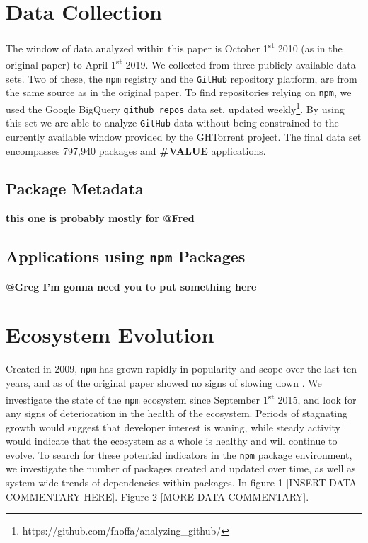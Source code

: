 \documentclass[10pt,conference]{IEEEtran}
\def\code#1{\texttt{#1}}
\begin{document}
\section{Data Collection}
The window of data analyzed within this paper is October 1\textsuperscript{st} 2010 (as in the original paper) to April 1\textsuperscript{st} 2019.
We collected from three publicly available data sets. Two of these, the \code{npm} registry and the \code{GitHub} repository platform, are from the same source as in the original paper.
To find repositories relying on \code{npm}, we used the Google BigQuery \code{github\_repos} data set, updated weekly\footnote{https://github.com/fhoffa/analyzing\_github/}.
By using this set we are able to analyze \code{GitHub} data without being constrained to the currently available window provided by the GHTorrent project\cite{Gousi13}.
The final data set encompasses 797,940 packages and \textbf{\#VALUE} applications.

\subsection{Package Metadata}

\textbf{this one is probably mostly for @Fred}

\subsection{Applications using \code{npm} Packages}

\textbf{@Greg I'm gonna need you to put something here}

\section{Ecosystem Evolution}

Created in 2009, \code{npm} has grown
rapidly in popularity and scope over the last ten years, and 
as of the original paper showed no signs of slowing down \cite{Wittern:2016}.
We investigate the state of the \code{npm} ecosystem
since September 1\textsuperscript{st} 2015, and look for any signs of deterioration in 
the health of the ecosystem. Periods of stagnating growth would suggest
that developer interest is waning, while steady activity would 
indicate that the ecosystem as a whole is healthy and will continue to
evolve. To search for these potential indicators in the \code{npm} package environment,
we investigate the number of packages created and updated over time, as well
as system-wide trends of dependencies within packages. In figure 1 
[INSERT DATA COMMENTARY HERE]. Figure 2 [MORE DATA COMMENTARY].
\end{document}
